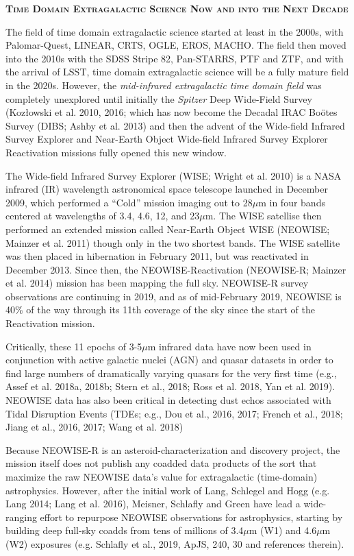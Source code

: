 \documentclass[12pt]{article}
\begin{document}
\pagebreak
\smallskip
\smallskip
\noindent
{\bfseries \textsc{\textcolor{Cerulean}{Time Domain Extragalactic Science Now and into the Next Decade}}}

\smallskip
\smallskip 
\noindent
The field of time domain extragalactic science started at least in the 2000s, with Palomar-Quest, LINEAR, CRTS, OGLE, EROS, MACHO. The field then moved into the 2010s with the SDSS Stripe 82, Pan-STARRS, PTF and ZTF, and with the arrival of LSST, time domain extragalactic science will be a fully mature field in the 2020s. However, the {\it mid-infrared extragalactic time domain field} was completely unexplored until initially the {\it Spitzer} Deep Wide-Field Survey (Koz{\l}owski et al. 2010, 2016; which has now become the Decadal IRAC Bo\"{o}tes Survey (DIBS; Ashby et al. 2013) and then the advent of the Wide-field Infrared Survey Explorer and Near-Earth Object Wide-field Infrared Survey Explorer Reactivation missions fully opened this new window.

\smallskip 
\smallskip 
\noindent
The Wide-field Infrared Survey Explorer (WISE; Wright et al. 2010) is
a NASA infrared (IR) wavelength astronomical space telescope launched
in December 2009, which performed a ``Cold'' mission imaging out to
28$\mu$m in four bands centered at wavelengths of 3.4, 4.6, 12, and
23$\mu$m. The WISE satellise then performed an extended mission called
Near-Earth Object WISE (NEOWISE; Mainzer et al. 2011) though only in
the two shortest bands. The WISE satellite was then placed in
hibernation in February 2011, but was reactivated in December 2013.
Since then, the NEOWISE-Reactivation (NEOWISE-R; Mainzer et al. 2014)
mission has been mapping the full sky. NEOWISE-R survey observations
are continuing in 2019, and as of mid-February 2019, NEOWISE is 40\%
of the way through its 11th coverage of the sky since the start of the
Reactivation mission.

\smallskip
\smallskip 
\noindent
Critically, these 11 epochs of 3-5$\mu$m infrared data have now been
used in conjunction with active galactic nuclei (AGN) and quasar
datasets in order to find large numbers of dramatically varying
quasars for the very first time (e.g., Assef et al. 2018a, 2018b; Stern
et al., 2018; Ross et al. 2018, Yan et al. 2019). NEOWISE data has
also been critical in detecting dust echos associated with Tidal
Disruption Events (TDEs; e.g., Dou et al., 2016, 2017; French et al., 2018;
Jiang et al., 2016, 2017; Wang et al. 2018)

\smallskip
\smallskip
\noindent
Because NEOWISE-R is an asteroid-characterization and discovery
project, the mission itself does not publish any coadded data products
of the sort that maximize the raw NEOWISE data’s value for
extragalactic (time-domain) astrophysics. However, after the initial
work of Lang, Schlegel and Hogg (e.g. Lang 2014; Lang et al. 2016),
Meisner, Schlafly and Green have lead a wide-ranging effort to
repurpose NEOWISE observations for astrophysics, starting by building
deep full-sky coadds from tens of millions of 3.4$\mu$m (W1) and
4.6$\mu$m (W2) exposures (e.g. Schlafly  et al., 2019, ApJS, 240, 30 and references
therein).
\end{document}
